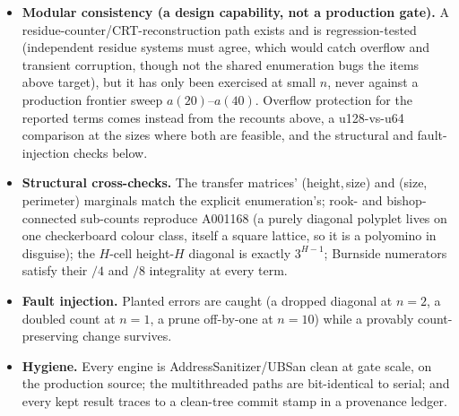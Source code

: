 \documentclass[11pt]{article}
\newcommand{\tiertwominus}{\textsf{T2}$^{-}$}
\begin{document}
\begin{itemize}
        of its rows $n=21$--$39$ simultaneously, re-confirming all nineteen
        wired levels at a fresh point each, in the sweep that produced
        $T(40,21)$. The \tiertwominus{} grade attaches to $a(39)$ and
        $a(40)$: their top real cells $T(39,20)$ and $T(40,21)$ lie on
        diagonal $k=19$, and $P_{19}$, fitted from exactly these two
        cells, has no independent holdout, nor ever will, the sequence
        closing at $a(40)$; it passes the leading-coefficient and
        integrality checks and is recorded, unused. Those strata run the
        same code path the lower $P_k$ certified: what lacks certification
        is the cells, not the code.
  \item \textbf{Modular consistency (a design capability, not a production
        gate).} A residue-counter/CRT-reconstruction path exists and is
        regression-tested (independent residue systems must agree, which
        would catch overflow and transient corruption, though not the
        shared enumeration bugs the items above target), but it has only
        been exercised at small $n$, never against a production frontier
        sweep $a(20)$--$a(40)$. Overflow protection for the reported terms
        comes instead from the recounts above, a u128-vs-u64 comparison at
        the sizes where both are feasible, and the structural and
        fault-injection checks below.
  \item \textbf{Structural cross-checks.} The transfer matrices'
        (height,\,size) and (size,\,perimeter) marginals match the explicit
        enumeration's; rook- and bishop-connected sub-counts reproduce
        A001168 (a purely diagonal polyplet lives on one checkerboard colour
        class, itself a square lattice, so it is a polyomino in disguise);
        the $H$-cell height-$H$ diagonal is exactly $3^{H-1}$;
        Burnside numerators satisfy their $/4$ and $/8$ integrality at every
        term.
  \item \textbf{Fault injection.} Planted errors are caught (a dropped
        diagonal at $n=2$, a doubled count at $n=1$, a prune off-by-one at
        $n=10$) while a provably count-preserving change survives.
  \item \textbf{Hygiene.} Every engine is AddressSanitizer/UBSan clean at
        gate scale, on the production source; the multithreaded paths are
        bit-identical to serial; and every kept result traces to a
        clean-tree commit stamp in a provenance ledger.
\end{itemize}
\end{document}
